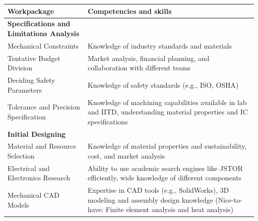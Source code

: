 \documentclass[12pt,a4paper]{article}
\begin{document}
\renewcommand{\arraystretch}{1.5}
\begin{tabular}{|m{4cm}|m{9cm}|}
    \hline
    \textbf{Workpackage} & \textbf{Competencies and skills} \\
    \hline
    \textbf{Specifications and Limitations Analysis} & \\
    \hline
    Mechanical Constraints & Knowledge of industry standards and materials \\
    \hline
    Tentative Budget Division & Market analysis, financial planning, and collaboration with different teams \\
    \hline
    Deciding Safety Parameters & Knowledge of safety standards (e.g., ISO, OSHA) \\
    \hline
    Tolerance and Precision Specification & Knowledge of machining capabilities available in lab and IITD, understanding material properties and IC specifications \\
    \hline
    \textbf{Initial Designing} & \\
    \hline
    Material and Resource Selection & Knowledge of material properties and sustainability, cost, and market analysis \\
    \hline
    Electrical and Electronics Research & Ability to use academic search engines like JSTOR efficiently, wide knowledge of different components \\
    \hline
    Mechanical CAD Models & Expertise in CAD tools (e.g., SolidWorks), 3D modeling and assembly design knowledge (Nice-to-have: Finite element analysis and heat analysis) \\
    \hline
\end{tabular}
\end{document}
